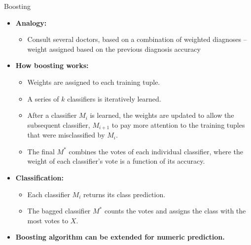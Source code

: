 \begin{frame}{Boosting}
	\begin{itemize}
		\item \textbf{Analogy:}
		      \begin{itemize}
			      \item Consult several doctors, based on a combination of weighted diagnoses -- weight assigned based on the previous diagnosis accuracy
		      \end{itemize}
		\item \textbf{How boosting works:}
		      \begin{itemize}
			      \item Weights are assigned to each training tuple.
			      \item A series of $k$ classifiers is iteratively learned.
			      \item After a classifier $M_i$ is learned, the weights are updated to allow the subsequent classifier, $M_{i+1}$ to pay more attention to the training tuples that were misclassified by $M_i$.
			      \item The final $M^*$ combines the votes of each individual classifier, where the weight of each classifier's vote is a function of its accuracy.
		      \end{itemize}
		\item \textbf{Classification:}
		      \begin{itemize}
			      \item Each classifier $M_i$ returns its class prediction.
			      \item The bagged classifier $M^*$ counts the votes and assigns the class with the most votes to $X$.
		      \end{itemize}
		\item \textbf{Boosting algorithm can be extended for numeric prediction.}
	\end{itemize}
\end{frame}

